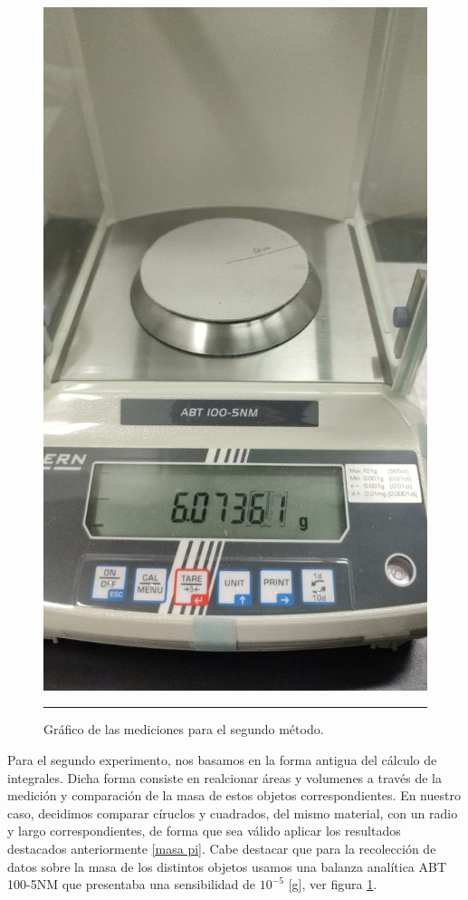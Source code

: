 \documentclass[10pt,a4paper]{article}
\begin{document}
\begin{multicols}{2}
		\begin{figure}[H]
			\centering
			\includegraphics[scale=0.1]{circulo_pi.jpeg}
			\caption{Gráfico de las mediciones para el segundo método.}
			\label{Mediciones foto}
			\rule{80mm}{0.1mm}
		\end{figure}
		
		
		Para el segundo experimento, nos basamos en la forma antigua del cálculo de integrales. Dicha forma consiste en realcionar áreas y volumenes a través de la medición y comparación de la masa de estos objetos correspondientes. En nuestro caso, decidimos comparar círuclos y cuadrados, del mismo material, con un radio y largo correspondientes, de forma que sea válido aplicar los resultados destacados anteriormente \ref{masa pi}. Cabe destacar que para la recolección de datos sobre la masa de los distintos objetos usamos una balanza analítica ABT 100-5NM que presentaba una sensibilidad de $10^{-5}$ [g], ver figura \ref{Mediciones foto}.\\
		

\end{multicols}
\end{document}
